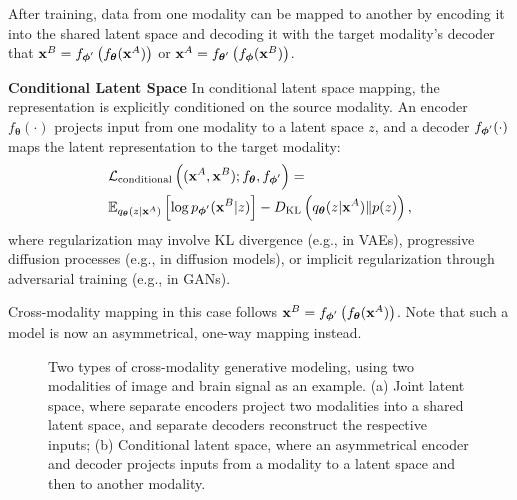 \documentclass[journal]{IEEEtran}
\begin{document}
After training, data from one modality can be mapped to another by encoding it into the shared latent space and decoding it with the target modality's decoder that $\mathbf{x}^{B} = f_{\smash{\boldsymbol{\phi}'}}\left(f_{\boldsymbol{\theta}}(\mathbf{x}^{A})\right)$ or $\mathbf{x}^{A} = f_{\smash{\boldsymbol{\theta}'}}\left(f_{\boldsymbol{\phi}}(\mathbf{x}^{B})\right)$.

\textbf{Conditional Latent Space} In conditional latent space mapping, the representation is explicitly conditioned on the source modality. An encoder $f_{\boldsymbol{\theta}} (\cdot)$ projects input from one modality to a latent space $z$, and a decoder $f_{\smash{\boldsymbol{\phi}'}} (\cdot)$ maps the latent representation to the target modality:
\begin{align}
& \mathcal{L}_{\text{conditional}} \left( (\mathbf{x}^A, \mathbf{x}^B); f_{\boldsymbol{\theta}}, f_{\smash{\boldsymbol{\phi}'}} \right) = \nonumber \\ & \hfill  \mathbb{E}_{q_{\boldsymbol{\theta}}(z | \mathbf{x}^A)} \left[ \log p_{\smash{\boldsymbol{\phi}'}}(\mathbf{x}^B | z) \right] - D_{\text{KL}} \left( q_{\boldsymbol{\theta}}(z | \mathbf{x}^A) \| p(z) \right),
\end{align}
where regularization may involve KL divergence (e.g., in VAEs), progressive diffusion processes (e.g., in diffusion models), or implicit regularization through adversarial training (e.g., in GANs).

Cross-modality mapping in this case follows $\mathbf{x}^{B} = f_{\smash{\boldsymbol{\phi}'}}\left(f_{\boldsymbol{\theta}}(\mathbf{x}^{A})\right)$. Note that such a model is now an asymmetrical, one-way mapping instead.

\begin{figure*}[htpb]
\centering
{}
\hspace{.1\linewidth}
\caption{Two types of cross-modality generative modeling, using two modalities of image and brain signal as an example. (a) Joint latent space, where separate encoders project two modalities into a shared latent space, and separate decoders reconstruct the respective inputs; (b) Conditional latent space, where an asymmetrical encoder and decoder projects inputs from a modality to a latent space and then to another modality.} \label{fig:generative}
\end{figure*}
\end{document}
